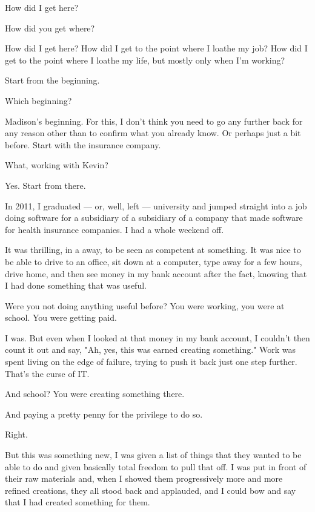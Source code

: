 \noindent How did I get here?

\begin{ally}
How did you get where?
\end{ally}
How did I get here? How did I get to the point where I loathe my job? How did I get to the point where I loathe my life, but mostly only when I'm working?

\begin{ally}
Start from the beginning.
\end{ally}
Which beginning?

\begin{ally}
Madison's beginning. For this, I don't think you need to go any further back for any reason other than to confirm what you already know. Or perhaps just a bit before. Start with the insurance company.
\end{ally}
What, working with Kevin?

\begin{ally}
Yes. Start from there.
\end{ally}
In 2011, I graduated --- or, well, left --- university and jumped straight into a job doing software for a subsidiary of a subsidiary of a company that made software for health insurance companies. I had a whole weekend off.

It was thrilling, in a away, to be seen as competent at something. It was nice to be able to drive to an office, sit down at a computer, type away for a few hours, drive home, and then see money in my bank account after the fact, knowing that I had done something that was useful.

\begin{ally}
Were you not doing anything useful before? You were working, you were at school. You were getting paid.
\end{ally}
I was. But even when I looked at that money in my bank account, I couldn't then count it out and say, "Ah, yes, this was earned creating something." Work was spent living on the edge of failure, trying to push it back just one step further. That's the curse of IT.

\begin{ally}
And school? You were creating something there.
\end{ally}
And paying a pretty penny for the privilege to do so.

\begin{ally}
Right.
\end{ally}
But this was something new, I was given a list of things that they wanted to be able to do and given basically total freedom to pull that off. I was put in front of their raw materials and, when I showed them progressively more and more refined creations, they all stood back and applauded, and I could bow and say that I had created something for them.

